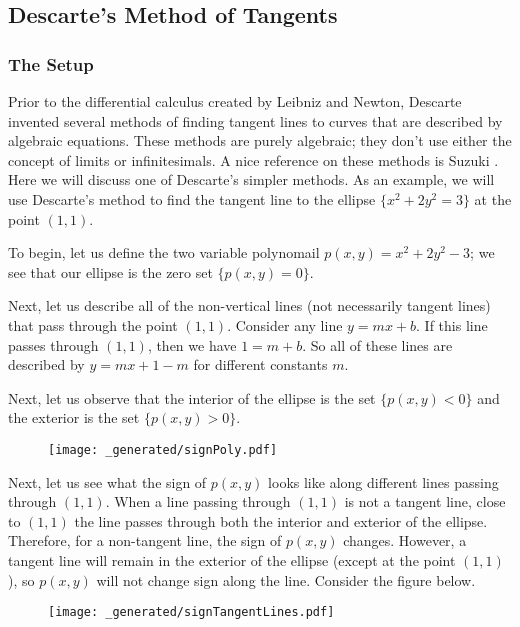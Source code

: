 \subsection{Descarte's Method of Tangents}

\subsubsection*{The Setup}

Prior to the differential calculus created by Leibniz and Newton, Descarte invented several methods of 
finding tangent lines to curves that are described by algebraic equations. These methods are purely
algebraic; they don't use either the concept of limits or infinitesimals. A nice reference on these
methods is Suzuki \cite{descarte}. Here we will discuss one of Descarte's simpler methods. As an example,
we will use Descarte's method to find the tangent line to the ellipse \(\{x^2 + 2y^2 = 3\}\) at the
point \((1,1)\).

To begin, let us define the two variable polynomail \(p(x,y) = x^2 + 2y^2 - 3\); we see that our ellipse is
the zero set \(\{p(x,y) = 0\} \).

Next, let us describe all of the non-vertical lines (not necessarily tangent lines) that pass through the 
point \((1,1)\). Consider any line \(y = mx + b\). If this line passes through \((1,1)\), then we have
\(1 = m + b\). So all of these lines are described by \(y = mx + 1 - m\) for different constants \(m\).

Next, let us observe that the interior of the ellipse is the set \(\{p(x,y) < 0\}\) and the exterior
is the set \(\{p(x,y) > 0\}\).
\begin{figure}[h]
\centering
\texttt{[image: \_generated/signPoly.pdf]}
\end{figure}

Next, let us see what the sign of \(p(x,y)\) looks like along different lines passing through \((1,1)\). 
When a line passing through \((1,1)\) is not a tangent line, close to \((1,1)\) the line passes through
both the interior and exterior of the ellipse. Therefore, for a non-tangent line, the sign of \(p(x,y)\)
changes. However, a tangent line will remain in the exterior of the ellipse (except at the point \((1,1)\)),
so \(p(x,y)\) will not change sign along the line. Consider the figure below.
\begin{figure}[h]
\centering
\texttt{[image: \_generated/signTangentLines.pdf]}
\end{figure}  

